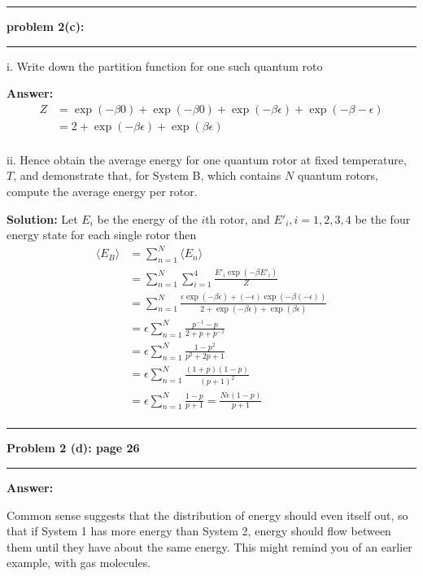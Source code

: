 \documentclass[11pt]{article}
\newcommand\question[2]{\vspace{.25in}\hrule\textbf{#1: #2}\vspace{.5em}\hrule\vspace{.10in}}
\begin{document}
\question{problem 2(c)}{}
i. Write down the partition function for one such quantum roto

\textbf{Answer:}
\begin{align*}
    Z &= \exp(-\beta 0 ) + \exp(-\beta 0 ) + \exp(-\beta \epsilon) + \exp(-\beta -\epsilon)\\ 
      &= 2 + \exp(-\beta \epsilon) + \exp(\beta \epsilon)\\
\end{align*}

ii. Hence obtain the average energy for one quantum rotor at fixed temperature, $T$, and demonstrate that, for System B, which contains $N$ quantum rotors, compute the average energy per rotor.

\textbf{Solution:}
Let $E_i$ be the energy of the $i$th rotor, and $E'_i, i=1,2,3,4$ be the four energy state for each single rotor  then
\begin{align*}
    \langle E_B \rangle &= \sum_{n=1}^{N} \langle E_n \rangle\\
                        &= \sum_{n=1}^{N}\sum_{i=1}^{4} \frac{E'_i\exp(-\beta E'_i)}{Z}\\
                        &=\sum_{n=1}^{N}\frac{ \epsilon\exp(-\beta \epsilon) + (-\epsilon)\exp(-\beta(-\epsilon))}{2 + \exp(-\beta \epsilon) + \exp(\beta \epsilon)}\\
                        &= \epsilon \sum_{n=1}^{N}\frac{p^{-1}-p}{2+p+p^{-1}}\\
                        &= \epsilon \sum_{n=1}^{N}\frac{1-p^2}{p^2+2p+1}\\
                        &= \epsilon \sum_{n=1}^{N}\frac{(1+p)(1-p)}{(p+1)^2}\\
                        &= \epsilon \sum_{n=1}^{N}\frac{1-p}{p+1} = \frac{N\epsilon (1-p)}{p+1}\\
\end{align*}

\question{Problem 2 (d)}{page 26}
\textbf{Answer:} 

Common sense suggests that the distribution of energy should even itself out, so that if System 1 has more energy than
System 2, energy should flow between them until they have about the same energy. This might remind you of an earlier example, with gas molecules.
\end{document}
